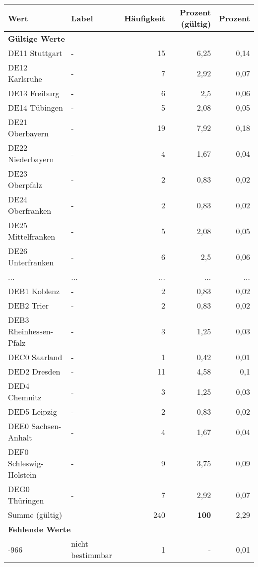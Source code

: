      \begin{longtable}{Xlrrr}
     \toprule
     \textbf{Wert} & \textbf{Label} & \textbf{Häufigkeit} & \textbf{Prozent (gültig)} & \textbf{Prozent} \\
     \endhead
     \midrule
     \multicolumn{5}{l}{\textbf{Gültige Werte}}\\
        \multicolumn{1}{X}{DE11 Stuttgart} & - & 15 & 6,25 & 0,14 \\
        \multicolumn{1}{X}{DE12 Karlsruhe} & - & 7 & 2,92 & 0,07 \\
        \multicolumn{1}{X}{DE13 Freiburg} & - & 6 & 2,5 & 0,06 \\
        \multicolumn{1}{X}{DE14 Tübingen} & - & 5 & 2,08 & 0,05 \\
        \multicolumn{1}{X}{DE21 Oberbayern} & - & 19 & 7,92 & 0,18 \\
        \multicolumn{1}{X}{DE22 Niederbayern} & - & 4 & 1,67 & 0,04 \\
        \multicolumn{1}{X}{DE23 Oberpfalz} & - & 2 & 0,83 & 0,02 \\
        \multicolumn{1}{X}{DE24 Oberfranken} & - & 2 & 0,83 & 0,02 \\
        \multicolumn{1}{X}{DE25 Mittelfranken} & - & 5 & 2,08 & 0,05 \\
        \multicolumn{1}{X}{DE26 Unterfranken} & - & 6 & 2,5 & 0,06 \\
       ... & ... & ... & ... & ... \\
        \multicolumn{1}{X}{DEB1 Koblenz} & - & 2 & 0,83 & 0,02 \\
        \multicolumn{1}{X}{DEB2 Trier} & - & 2 & 0,83 & 0,02 \\
        \multicolumn{1}{X}{DEB3 Rheinhessen-Pfalz} & - & 3 & 1,25 & 0,03 \\
        \multicolumn{1}{X}{DEC0 Saarland} & - & 1 & 0,42 & 0,01 \\
        \multicolumn{1}{X}{DED2 Dresden} & - & 11 & 4,58 & 0,1 \\
        \multicolumn{1}{X}{DED4 Chemnitz} & - & 3 & 1,25 & 0,03 \\
        \multicolumn{1}{X}{DED5 Leipzig} & - & 2 & 0,83 & 0,02 \\
        \multicolumn{1}{X}{DEE0 Sachsen-Anhalt} & - & 4 & 1,67 & 0,04 \\
        \multicolumn{1}{X}{DEF0 Schleswig-Holstein} & - & 9 & 3,75 & 0,09 \\
        \multicolumn{1}{X}{DEG0 Thüringen} & - & 7 & 2,92 & 0,07 \\
     \midrule
      \multicolumn{2}{l}{Summe (gültig)} & 240 &
      \textbf{100} &
         2,29 \\
     \multicolumn{5}{l}{\textbf{Fehlende Werte}}\\
       -966 & nicht bestimmbar & 1 & - & 0,01 \\


\end{longtable}
